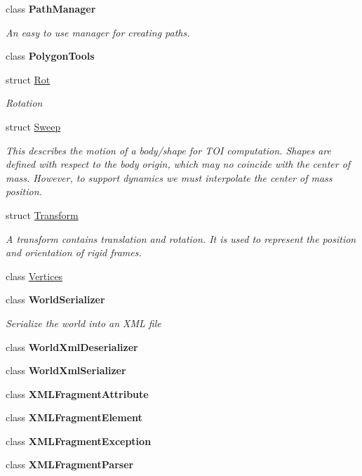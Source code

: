 \begin{DoxyCompactItemize}
class {\bfseries Path\+Manager}
\begin{DoxyCompactList}\small\item\em An easy to use manager for creating paths. \end{DoxyCompactList}\item 
class {\bfseries Polygon\+Tools}
\item 
struct \hyperlink{struct_farseer_physics_1_1_common_1_1_rot}{Rot}
\begin{DoxyCompactList}\small\item\em Rotation \end{DoxyCompactList}\item 
struct \hyperlink{struct_farseer_physics_1_1_common_1_1_sweep}{Sweep}
\begin{DoxyCompactList}\small\item\em This describes the motion of a body/shape for T\+O\+I computation. Shapes are defined with respect to the body origin, which may no coincide with the center of mass. However, to support dynamics we must interpolate the center of mass position. \end{DoxyCompactList}\item 
struct \hyperlink{struct_farseer_physics_1_1_common_1_1_transform}{Transform}
\begin{DoxyCompactList}\small\item\em A transform contains translation and rotation. It is used to represent the position and orientation of rigid frames. \end{DoxyCompactList}\item 
class \hyperlink{class_farseer_physics_1_1_common_1_1_vertices}{Vertices}
\item 
class {\bfseries World\+Serializer}
\begin{DoxyCompactList}\small\item\em Serialize the world into an X\+M\+L file \end{DoxyCompactList}\item 
class {\bfseries World\+Xml\+Deserializer}
\item 
class {\bfseries World\+Xml\+Serializer}
\item 
class {\bfseries X\+M\+L\+Fragment\+Attribute}
\item 
class {\bfseries X\+M\+L\+Fragment\+Element}
\item 
class {\bfseries X\+M\+L\+Fragment\+Exception}
\item 
class {\bfseries X\+M\+L\+Fragment\+Parser}
\end{DoxyCompactItemize}
